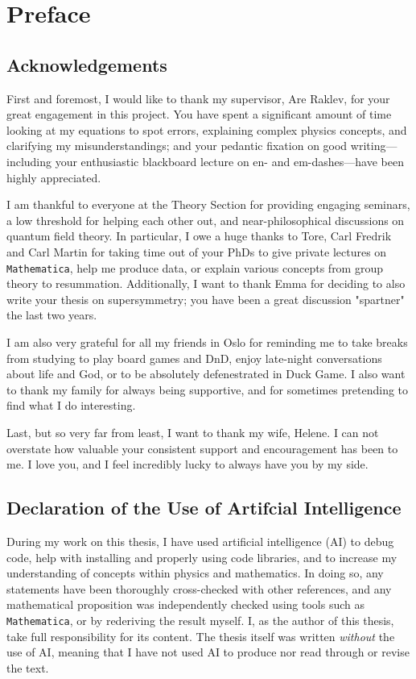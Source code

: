 \chapter*{Preface}

\section*{Acknowledgements}
First and foremost, I would like to thank my supervisor, Are Raklev, for your great engagement in this project.
You have spent a significant amount of time looking at my equations to spot errors, explaining complex physics concepts, and clarifying my misunderstandings; and your pedantic fixation on good writing---including your enthusiastic blackboard lecture on en- and em-dashes---have been highly appreciated.

I am thankful to everyone at the Theory Section for providing engaging seminars, a low threshold for helping each other out, and near-philosophical discussions on quantum field theory.
In particular, I owe a huge thanks to Tore, Carl Fredrik and Carl Martin for taking time out of your PhDs to give private lectures on \texttt{Mathematica}, help me produce data, or explain various concepts from group theory to resummation.
Additionally, I want to thank Emma for deciding to also write your thesis on supersymmetry; you have been a great discussion "spartner" the last two years.

I am also very grateful for all my friends in Oslo for reminding me to take breaks from studying to play board games and DnD, enjoy late-night conversations about life and God, or to be absolutely defenestrated in Duck Game.
I also want to thank my family for always being supportive, and for sometimes pretending to find what I do interesting.

Last, but so very far from least, I want to thank my wife, Helene.
I can not overstate how valuable your consistent support and encouragement has been to me.
I love you, and I feel incredibly lucky to always have you by my side.



\section*{Declaration of the Use of Artifcial Intelligence}
During my work on this thesis, I have used artificial intelligence (AI) to debug code, help with installing and properly using code libraries, and to increase my understanding of concepts within physics and mathematics.
In doing so, any statements have been thoroughly cross-checked with other references, and any mathematical proposition was independently checked using tools such as \texttt{Mathematica}, or by rederiving the result myself.
I, as the author of this thesis, take full responsibility for its content.
The thesis itself was written \emph{without} the use of AI, meaning that I have not used AI to produce nor read through or revise the text.


